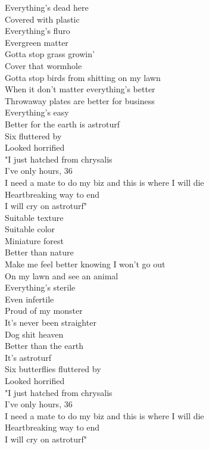 


Everything's dead here\\
Covered with plastic\\
Everything's fluro\\
Evergreen matter\\
Gotta stop grass growin'\\
Cover that wormhole\\
Gotta stop birds from shitting on my lawn\\
When it don't matter everything's better\\
Throwaway plates are better for business\\
Everything's easy\\
Better for the earth is astroturf\\

Six  fluttered by\\
Looked horrified\\
"I just hatched from chrysalis\\
I've only hours, 36\\
I need a mate to do my biz and this is where I will die\\
Heartbreaking way to end\\
I will cry on astroturf"\\

Suitable texture\\
Suitable color\\
Miniature forest\\
Better than nature\\
Make me feel better knowing I won't go out\\
On my lawn and see an animal\\
Everything's sterile\\
Even infertile\\
Proud of my monster\\
It's never been straighter\\
Dog shit heaven\\
Better than the earth\\
It's astroturf\\

Six butterflies fluttered by\\
Looked horrified\\
"I just hatched from chrysalis\\
I've only hours, 36\\
I need a mate to do my biz and this is where I will die\\
Heartbreaking way to end\\
I will cry on astroturf"\\

